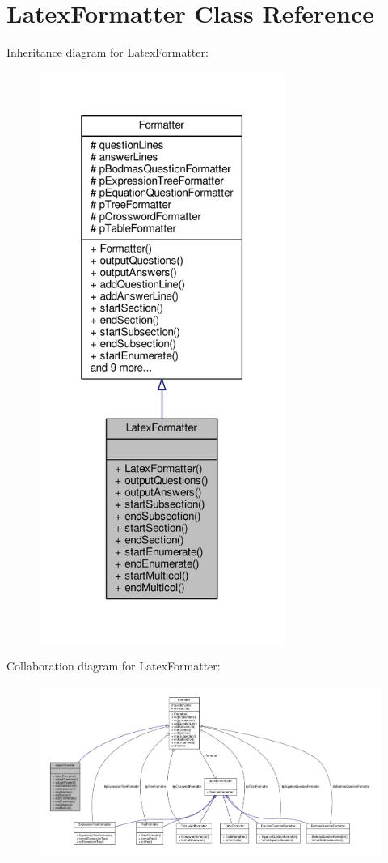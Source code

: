 \hypertarget{classLatexFormatter}{}\section{Latex\+Formatter Class Reference}
\label{classLatexFormatter}


Inheritance diagram for Latex\+Formatter\+:
\nopagebreak
\begin{figure}[H]
\begin{center}
\leavevmode
\includegraphics[width=229pt]{classLatexFormatter__inherit__graph}
\end{center}
\end{figure}


Collaboration diagram for Latex\+Formatter\+:
\nopagebreak
\begin{figure}[H]
\begin{center}
\leavevmode
\includegraphics[width=350pt]{classLatexFormatter__coll__graph}
\end{center}
\end{figure}
